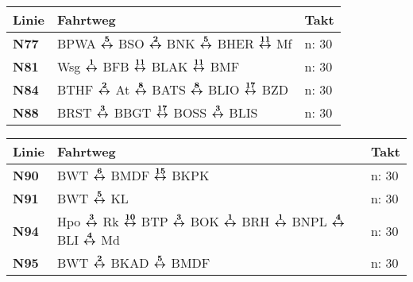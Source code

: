 \begin{minipage}[t]{0.05\textwidth}
\phantom{Tor}
\end{minipage}
\begin{minipage}[t]{0.45\textwidth}
\begin{tabular}{>{\bfseries}L{1.2cm}L{9.0cm}L{3.0cm}}
{\bfseries Linie} & {\bfseries Fahrtweg} & {\bfseries Takt} \\
\hline
\nbus{} N77   & BPWA $\boldsymbol{\overset{5}{\leftrightarrow}}$ BSO $\boldsymbol{\overset{2}{\leftrightarrow}}$ BNK $\boldsymbol{\overset{5}{\leftrightarrow}}$ BHER $\boldsymbol{\overset{11}{\leftrightarrow}}$ Mf                                                                                               & n: 30                      \\
\nbus{} N81   & Wsg $\boldsymbol{\overset{1}{\leftrightarrow}}$ BFB $\boldsymbol{\overset{11}{\leftrightarrow}}$ BLAK $\boldsymbol{\overset{11}{\leftrightarrow}}$ BMF                                                                                                              & n: 30                      \\
\nbus{} N84   & BTHF $\boldsymbol{\overset{2}{\leftrightarrow}}$ At $\boldsymbol{\overset{8}{\leftrightarrow}}$ BATS $\boldsymbol{\overset{8}{\leftrightarrow}}$ BLIO $\boldsymbol{\overset{17}{\leftrightarrow}}$ BZD                                                                                              & n: 30                      \\
\nbus{} N88   & BRST $\boldsymbol{\overset{3}{\leftrightarrow}}$ BBGT $\boldsymbol{\overset{17}{\leftrightarrow}}$ BOSS $\boldsymbol{\overset{3}{\leftrightarrow}}$ BLIS                                                                                                            & n: 30                      \\
\hline
\end{tabular}
\end{minipage}
\begin{minipage}[t]{0.45\textwidth}
\begin{tabular}{>{\bfseries}L{1.2cm}L{9.0cm}L{3.0cm}}
{\bfseries Linie} & {\bfseries Fahrtweg} & {\bfseries Takt} \\
\hline
\nbus{} N90   & BWT $\boldsymbol{\overset{6}{\leftrightarrow}}$ BMDF $\boldsymbol{\overset{15}{\leftrightarrow}}$ BKPK                                                                                                                              & n: 30                      \\
\nbus{} N91   & BWT $\boldsymbol{\overset{5}{\leftrightarrow}}$ KL                                                                                                                                                  & n: 30                      \\
\nbus{} N94   & Hpo $\boldsymbol{\overset{3}{\leftrightarrow}}$ Rk $\boldsymbol{\overset{10}{\leftrightarrow}}$ BTP $\boldsymbol{\overset{3}{\leftrightarrow}}$ BOK $\boldsymbol{\overset{1}{\leftrightarrow}}$ BRH $\boldsymbol{\overset{1}{\leftrightarrow}}$ BNPL $\boldsymbol{\overset{4}{\leftrightarrow}}$ BLI $\boldsymbol{\overset{4}{\leftrightarrow}}$ Md                                                 & n: 30                      \\
\nbus{} N95   & BWT $\boldsymbol{\overset{2}{\leftrightarrow}}$ BKAD $\boldsymbol{\overset{5}{\leftrightarrow}}$ BMDF                                                                                                                               & n: 30                      \\
\hline
\end{tabular}
\end{minipage}
